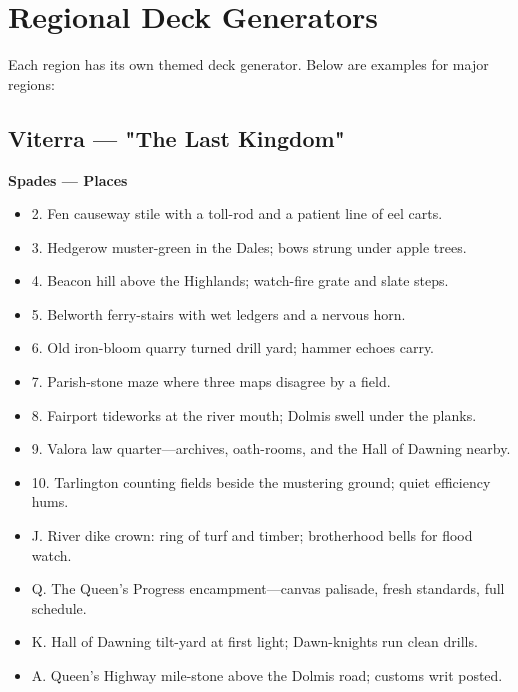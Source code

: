 \section{Regional Deck Generators}

Each region has its own themed deck generator. Below are examples for major regions:

\subsection*{Viterra — "The Last Kingdom"}

\textbf{Spades — Places}
\begin{itemize}
  \item 2. Fen causeway stile with a toll-rod and a patient line of eel carts.
  \item 3. Hedgerow muster-green in the Dales; bows strung under apple trees.
  \item 4. Beacon hill above the Highlands; watch-fire grate and slate steps.
  \item 5. Belworth ferry-stairs with wet ledgers and a nervous horn.
  \item 6. Old iron-bloom quarry turned drill yard; hammer echoes carry.
  \item 7. Parish-stone maze where three maps disagree by a field.
  \item 8. Fairport tideworks at the river mouth; Dolmis swell under the planks.
  \item 9. Valora law quarter—archives, oath-rooms, and the Hall of Dawning nearby.
  \item 10. Tarlington counting fields beside the mustering ground; quiet efficiency hums.
  \item J. River dike crown: ring of turf and timber; brotherhood bells for flood watch.
  \item Q. The Queen's Progress encampment—canvas palisade, fresh standards, full schedule.
  \item K. Hall of Dawning tilt-yard at first light; Dawn-knights run clean drills.
  \item A. Queen's Highway mile-stone above the Dolmis road; customs writ posted.
\end{itemize}

